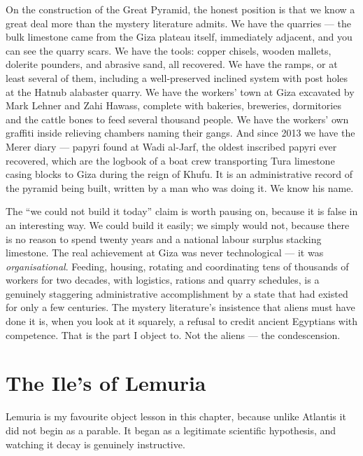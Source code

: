 On the construction of the Great Pyramid, the honest position is that we know a great deal more than
the mystery literature admits. We have the quarries --- the bulk limestone came from the Giza plateau
itself, immediately adjacent, and you can see the quarry scars. We have the tools: copper chisels,
wooden mallets, dolerite pounders, and abrasive sand, all recovered. We have the ramps, or at least
several of them, including a well-preserved inclined system with post holes at the Hatnub alabaster
quarry. We have the workers' town at Giza excavated by Mark Lehner and Zahi Hawass, complete with
bakeries, breweries, dormitories and the cattle bones to feed several thousand people. We have the
workers' own graffiti inside relieving chambers naming their gangs. And since 2013 we have the Merer
diary --- papyri found at Wadi al-Jarf, the oldest inscribed papyri ever recovered, which are the
logbook of a boat crew transporting Tura limestone casing blocks to Giza during the reign of Khufu.
It is an administrative record of the pyramid being built, written by a man who was doing it. We know
his name.

\begin{funfact}
The ``we could not build it today'' claim is worth pausing on, because it is false in an interesting
way. We could build it easily; we simply would not, because there is no reason to spend twenty years
and a national labour surplus stacking limestone. The real achievement at Giza was never technological
--- it was \emph{organisational}. Feeding, housing, rotating and coordinating tens of thousands of
workers for two decades, with logistics, rations and quarry schedules, is a genuinely staggering
administrative accomplishment by a state that had existed for only a few centuries. The mystery
literature's insistence that aliens must have done it is, when you look at it squarely, a refusal to
credit ancient Egyptians with competence. That is the part I object to. Not the aliens --- the
condescension.
\end{funfact}

\section{The Ile's of Lemuria}\label{sec:ileslemuria}

Lemuria is my favourite object lesson in this chapter, because unlike Atlantis it did not begin as a
parable. It began as a legitimate scientific hypothesis, and watching it decay is genuinely
instructive.

